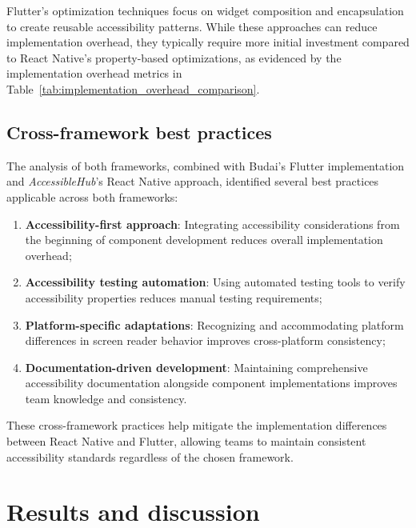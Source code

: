 Flutter's optimization techniques focus on widget composition and encapsulation to create reusable accessibility patterns. While these approaches can reduce implementation overhead, they typically require more initial investment compared to React Native's property-based optimizations, as evidenced by the implementation overhead metrics in Table~\ref{tab:implementation_overhead_comparison}.

\subsection{Cross-framework best practices}
\label{subsec:cross-framework-practices}

The analysis of both frameworks, combined with Budai's Flutter implementation and \textit{AccessibleHub}'s React Native approach, identified several best practices applicable across both frameworks:

\begin{enumerate}
    \item \textbf{Accessibility-first approach}: Integrating accessibility considerations from the beginning of component development reduces overall implementation overhead;
    
    \item \textbf{Accessibility testing automation}: Using automated testing tools to verify accessibility properties reduces manual testing requirements;
    
    \item \textbf{Platform-specific adaptations}: Recognizing and accommodating platform differences in screen reader behavior improves cross-platform consistency;
    
    \item \textbf{Documentation-driven development}: Maintaining comprehensive accessibility documentation alongside component implementations improves team knowledge and consistency.
\end{enumerate}

These cross-framework practices help mitigate the implementation differences between React Native and Flutter, allowing teams to maintain consistent accessibility standards regardless of the chosen framework.

\section{Results and discussion}
\label{sec:results-discussion}

